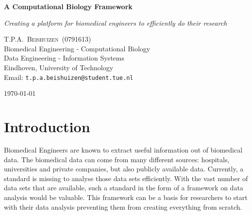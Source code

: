 \documentclass[10pt,a4paper]{article}
\newcommand{\documenttitle}{A Computational Biology Framework}
\newcommand{\documentsubtitle}{Creating a platform for biomedical engineers to efficiently do their research}
\begin{document}
	
	\begin{titlepage}
		
		\center
		
		\vspace*{3cm}
		
		\textbf{\huge \documenttitle}
		
		\textit{\LARGE \documentsubtitle}
		
		\vspace*{2cm}
		
		\large
		\centering
		T.P.A.~\textsc{Beishuizen}~(0791613)\\
		Biomedical Engineering - Computational Biology\\
		Data Engineering - Information Systems\\
		Eindhoven, University of Technology\\
		Email: \texttt{t.p.a.beishuizen@student.tue.nl}
		
		\vfill
		
		\vspace*{1cm}
		
		\today
		
	\end{titlepage}
	
	\tableofcontents
	
	
	\pagestyle{fancy}
	\fancyhead{} %
	\fancyfoot{} %
	\renewcommand{\headrulewidth}{0.4pt}
	\renewcommand{\footrulewidth}{0.4pt}
	
	\fancyhead[L]{\rightmark}
	\fancyfoot[C]{\thepage}
	
	
	\clearpage
	
	\section{Introduction}
	\label{sec:Introduction}
	
	Biomedical Engineers are known to extract useful information out of biomedical data. The biomedical data can come from many different sources: hospitals, universities and private companies, but also publicly available data.  Currently, a standard is missing to analyse those data sets efficiently. With the vast number of data sets that are available, such a standard in the form of a framework on data analysis would be valuable. This framework can be a basis for researchers to start with their data analysis preventing them from creating everything from scratch.
	
\end{document}

